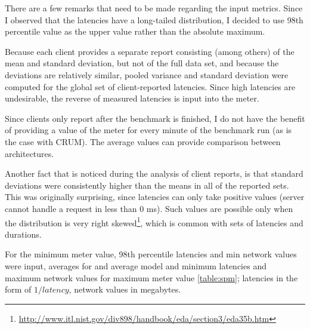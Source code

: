 \documentclass{uvamscse}
\begin{document}
There are a few remarks that need to be made regarding the input metrics. Since I observed that the latencies have a long-tailed distribution, I decided to use 98th percentile value as the upper value rather than the absolute maximum.

Because each client provides a separate report consisting (among others) of the mean and standard deviation, but not of the full data set, and because the deviations are relatively similar, pooled variance and standard deviation were computed for the global set of client-reported latencies. Since high latencies are undesirable, the reverse of measured latencies is input into the meter.

Since clients only report after the benchmark is finished, I do not have the benefit of providing a value of the meter for every minute of the benchmark run (as is the case with CRUM). The average values can provide comparison between architectures.

Another fact that is noticed during the analysis of client reports, is that standard deviations were consistently higher than the means in all of the reported sets. This was originally surprising, since latencies can only take positive values (server cannot handle a request in less than 0 ms). Such values are possible only when the distribution is very right skewed\footnote{\url{http://www.itl.nist.gov/div898/handbook/eda/section3/eda35b.htm}}, which is common with sets of latencies and durations.

For the minimum meter value, 98th percentile latencies and min network values were input, averages for and average model and minimum latencies and maximum network values for maximum meter value \ref{table:spm}; latencies in the form of $1/latency$, network values in megabytes.
\end{document}
